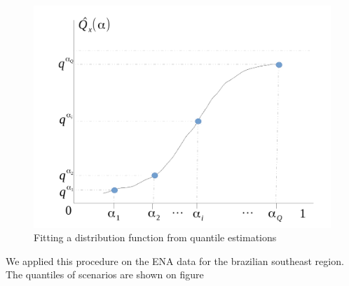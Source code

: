 \begin{figure}[h]
\centering
\includegraphics[width=0.7\linewidth]{Figuras/grafico-quantis-fx}
\caption{Fitting a distribution function from quantile estimations}
\label{fig:grafico-quantis-fx}
\end{figure}


We applied this procedure on the ENA data for the brazilian southeast region. The quantiles of scenarios are shown on figure  

